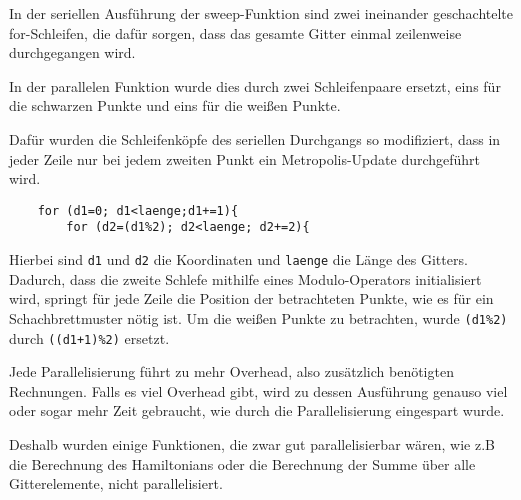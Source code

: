 	In der seriellen Ausführung der sweep-Funktion sind zwei ineinander geschachtelte for-Schleifen, die dafür sorgen, dass das gesamte Gitter einmal zeilenweise durchgegangen wird.
	
	In der parallelen Funktion wurde dies durch zwei Schleifenpaare ersetzt, eins für die schwarzen Punkte und eins für die weißen Punkte.
	
	Dafür wurden die Schleifenköpfe des seriellen Durchgangs so modifiziert, dass in jeder Zeile nur bei jedem zweiten Punkt ein Metropolis-Update durchgeführt wird. 
	\begin{verbatim}
	for (d1=0; d1<laenge;d1+=1){
		for (d2=(d1%2); d2<laenge; d2+=2){
	\end{verbatim}
	Hierbei sind \texttt{d1} und \texttt{d2} die Koordinaten und \texttt{laenge} die Länge des Gitters. Dadurch, dass die zweite Schlefe mithilfe eines Modulo-Operators initialisiert wird, springt für jede Zeile die Position der betrachteten Punkte, wie es für ein Schachbrettmuster nötig ist. Um die weißen Punkte zu betrachten, wurde \texttt{(d1\%2)} durch \texttt{((d1+1)\%2)} ersetzt.
	
	Jede Parallelisierung führt zu mehr Overhead, also zusätzlich benötigten Rechnungen. Falls es viel Overhead gibt, wird zu dessen Ausführung genauso viel oder sogar mehr Zeit gebraucht, wie durch die Parallelisierung eingespart wurde.
	
	Deshalb wurden einige Funktionen, die zwar gut parallelisierbar wären, wie z.B die Berechnung des Hamiltonians oder die Berechnung der Summe über alle Gitterelemente, nicht parallelisiert.
	

	
